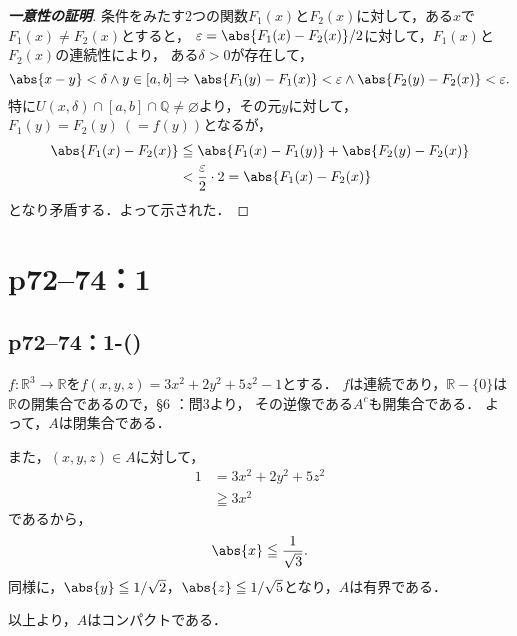 \begin{leftbar}
    \begin{proof}[\textup{\textbf{一意性の証明}}]
        条件をみたす2つの関数$F_1 (x)$と$F_2(x)$に対して，ある$x$で$F_1(x) \ne F_2(x)$とすると，
        $\varepsilon = \abs{F_1(x) - F_2(x)}/2$に対して，$F_1(x)$と$F_2(x)$の連続性により，
        ある$\delta >0$が存在して，
        \[
            \abs{x-y}<\delta \land y \in [a,b] \Rightarrow \abs{F_1(y)-F_1(x)}<\varepsilon \land  \abs{F_2(y)-F_2(x)}<\varepsilon.
        \]
        特に$ U (x,\delta) \cap [a,b] \cap \mathbb{Q} \ne \varnothing$より，その元$y$に対して，
        $F_1 (y)=F_2(y)~(=f(y))$となるが，
        \begin{align*}
            \abs{F_1(x)-F_2(x)} & \leqq \abs{F_1(x)-F_1(y)} + \abs{F_2(y)-F_2(x)}          \\
                                & < \frac{\varepsilon}{2} \cdot 2  = \abs{F_1(x) - F_2(x)}
        \end{align*}
        となり矛盾する．よって示された．
    \end{proof}
\end{leftbar}

\newpage

\section*{p72--74：1}


\subsection*{p72--74：1-()}

\begin{tleftbar}
    $ f\colon \mathbb{R}^3 \to \mathbb{R}$を$f(x,y,z)=3x^2 + 2y^2 + 5z^2 -1$とする．
    $f$は連続であり，$\mathbb{R} -\{ 0 \}$は$\mathbb{R}$の開集合であるので，\S 6 ：問3より，
    その逆像である$A^c$も開集合である．
    よって，$A$は閉集合である．

    また，$(x,y,z) \in A$に対して，
    \begin{align*}
        1 & = 3x^2 + 2y^2 + 5z^2 \\
          & \geqq 3x^2
    \end{align*}
    であるから，
    \[
        \abs{x} \leqq \frac{1}{\sqrt{3}}.
    \]
    同様に，$ \abs{y} \leqq 1/\sqrt{2}$，$\abs{z} \leqq 1/\sqrt{5}$となり，$A$は有界である．

    以上より，$A$はコンパクトである．
\end{tleftbar}


